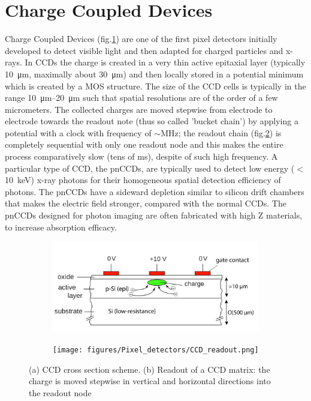     
\section{Charge Coupled Devices}
   Charge Coupled Devices (fig.\ref{fig:CCD_scheme}) are one of the first pixel detectors initially developed to detect visible light and then adapted for charged particles and x-rays. 
   In CCDs the charge is created in a very thin active epitaxial layer (typically \SI{10}{\um}, maximally about \SI{30}{\um}) and then locally stored in a potential minimum which is created by a MOS structure. 
   The size of the CCD cells is typically in the range \SIrange{10}{20}{\um} such that spatial resolutions are of the order of a few micrometers.
   The collected charges are moved stepwise from electrode to electrode towards the readout note (thus so called 'bucket chain') by applying a potential with a clock with frequency of $\sim$\si{MHz}; the readout chain (fig.\ref{fig:CCD_readout}) is completely sequential with only one readout node and this makes the entire process comparatively slow (tens of \si{ms}), despite of such high frequency.
   A particular type of CCD, the pnCCDs, are typically used to detect low energy ($<$\SI{10}{keV}) x-ray photons for their homogeneous spatial detection efficiency of photons. The pnCCDs have a sideward depletion similar to silicon drift chambers that makes the electric field stronger, compared with the normal CCDs. 
   The pnCCDs designed for photon imaging are often fabricated with high Z materials, to increase absorption efficacy.
   \begin{figure}
      \centering
      \begin{subfigure}[b]{0.49\textwidth}
          \centering
          \includegraphics[width=1.05\linewidth]{figures/Pixel_detectors/CCD.png}
          \caption{}
          \label{fig:CCD_scheme}
      \end{subfigure}
      \hfill
      \begin{subfigure}[b]{0.49\textwidth}
          \centering
          \texttt{[image: figures/Pixel\_detectors/CCD\_readout.png]}          
          \caption{}
          \label{fig:CCD_readout}
      \end{subfigure}
         \caption{(a) CCD cross section scheme. (b) Readout of a CCD matrix: the charge is moved stepwise in vertical and horizontal directions into the readout node}
         \label{fig:CCD}
   \end{figure}


